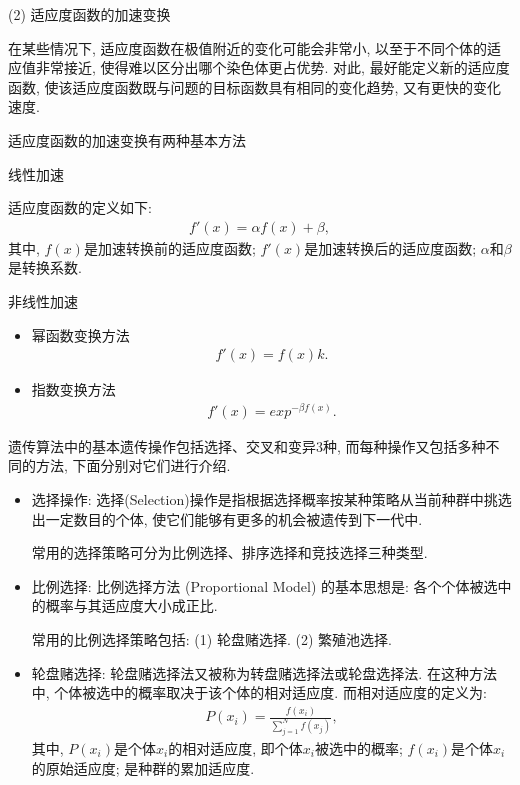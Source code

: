 (2) 适应度函数的加速变换

在某些情况下, 适应度函数在极值附近的变化可能会非常小, 以至于不同个体的适应值非常接近, 使得难以区分出哪个染色体更占优势.
对此, 最好能定义新的适应度函数, 使该适应度函数既与问题的目标函数具有相同的变化趋势, 又有更快的变化速度.

适应度函数的加速变换有两种基本方法

 线性加速

适应度函数的定义如下:
\begin{align}
    f'(x)=\alpha f(x)+\beta,
\end{align}
其中, $f(x)$是加速转换前的适应度函数; $f'(x)$是加速转换后的适应度函数;  $\alpha$和$\beta$是转换系数.

  非线性加速
\begin{itemize}
\item 幂函数变换方法
   \begin{align}
        f'(x)=f(x)k.
   \end{align}
\item 指数变换方法
         \begin{align}
            f'(x)=exp^{-\beta f(x)}.
         \end{align}
\end{itemize}

遗传算法中的基本遗传操作包括选择、交叉和变异3种, 而每种操作又包括多种不同的方法, 下面分别对它们进行介绍.

\begin{itemize}
\item 选择操作: 选择(Selection)操作是指根据选择概率按某种策略从当前种群中挑选出一定数目的个体, 使它们能够有更多的机会被遗传到下一代中.

    常用的选择策略可分为比例选择、排序选择和竞技选择三种类型.

\item 比例选择: 比例选择方法 (Proportional Model) 的基本思想是: 各个个体被选中的概率与其适应度大小成正比.

    常用的比例选择策略包括: (1) 轮盘赌选择. (2) 繁殖池选择.

\item 轮盘赌选择: 轮盘赌选择法又被称为转盘赌选择法或轮盘选择法. 在这种方法中, 个体被选中的概率取决于该个体的相对适应度. 而相对适应度的定义为:
\begin{align}
    P\left(x_{i}\right)=\frac{f\left(x_{i}\right)}{\sum_{j=1}^{N} f\left(x_{j}\right)},
\end{align}
其中, $P(x_i)$是个体$x_i$的相对适应度, 即个体$x_i$被选中的概率; $f(x_i)$是个体$x_i$的原始适应度; 是种群的累加适应度.
\end{itemize}

